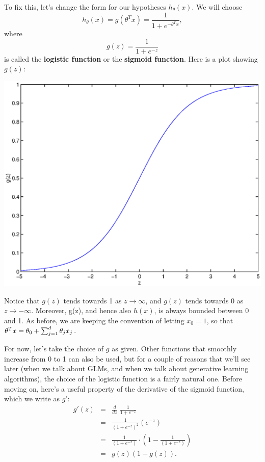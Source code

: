 \documentclass{article}
\begin{document}
To fix this, let's change the form for our hypotheses $h_\theta(x)$.  We
will choose
\[
h_\theta(x) = g(\theta^Tx) = \frac{1}{1+e^{-\theta^Tx}},
\]
where
\[
g(z) = \frac{1}{1+e^{-z}}
\]
is called the {\bf logistic function} or the {\bf sigmoid function}.
Here is a plot showing $g(z)$:
\begin{center}
\includegraphics[scale=0.4]{sigmoid.eps}
\end{center}
Notice that $g(z)$ tends towards 1 as $z \rightarrow \infty$, and $g(z)$ tends
towards 0 as $z \rightarrow -\infty$.  Moreover, g(z), and hence also $h(x)$, is
always bounded between 0 and 1.  As before, we are keeping the convention
of letting $x_0=1$, so
that $\theta^Tx = \theta_0 + \sum_{j=1}^{d} \theta_j x_j$.

For now, let's take the choice of $g$ as given.  Other functions that smoothly
increase from 0 to 1 can also be used, but for a couple of reasons that we'll
see later (when we talk about GLMs, and when we talk about generative
learning algorithms),
the choice of the logistic function is a fairly natural one.
Before moving on, here's a useful property of the derivative of the sigmoid function,
which we write as $g'$:
\begin{eqnarray*}
g'(z) &=& \frac{d}{dz} \;\frac{1}{1+e^{-z}} \\
&=&\frac{1}{(1+e^{-z})^2}\left(e^{-z}\right) \\
&=& \frac{1}{(1+e^{-z})}\cdot \left(1 - \frac{1}{(1+e^{-z})}\right) \\
&=& g(z) (1-g(z)).
\end{eqnarray*}
\end{document}

